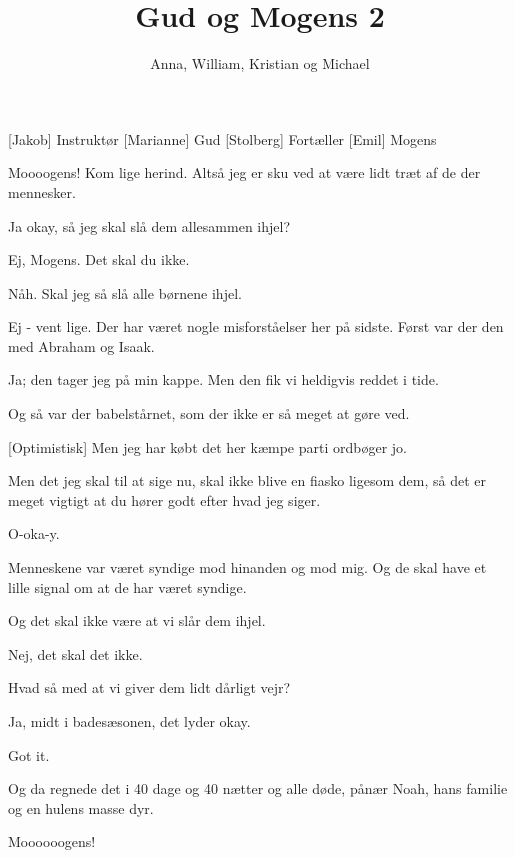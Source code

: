 \documentclass[a4paper,11pt]{article}
\title{Gud og Mogens 2}
\author{Anna, William, Kristian og Michael}
\begin{document}
\maketitle

\begin{roles}
[Jakob] Instruktør
[Marianne] Gud
[Stolberg] Fortæller
[Emil] Mogens
\end{roles}


  
\begin{sketch}

 Moooogens! Kom lige herind. Altså jeg er sku ved at være lidt træt af de der mennesker.

 Ja okay, så jeg skal slå dem allesammen ihjel?

 Ej, Mogens. Det skal du ikke.

 Nåh. Skal jeg så slå alle børnene ihjel.

 Ej - vent lige. Der har været nogle misforståelser her på sidste. Først var der den med Abraham og Isaak.

 Ja; den tager jeg på min kappe. Men den fik vi heldigvis reddet i tide.

 Og så var der babelstårnet, som der ikke er så meget at gøre ved.

[Optimistisk] Men jeg har købt det her kæmpe parti ordbøger jo. 

 Men det jeg skal til at sige nu, skal ikke blive en fiasko ligesom dem, så det er meget vigtigt at du hører godt efter hvad jeg siger.

 O-oka-y.

 Menneskene var været syndige mod hinanden og mod mig. Og de skal have et lille signal om at de har været syndige.

 Og det skal ikke være at vi slår dem ihjel.

 Nej, det skal det ikke.

 Hvad så med at vi giver dem lidt dårligt vejr?

 Ja, midt i badesæsonen, det lyder okay.

  Got it. 

 Og da regnede det i 40 dage og 40 nætter og alle døde, pånær Noah, hans familie og en hulens masse dyr.

 Moooooogens!



\end{sketch}
\end{document}

